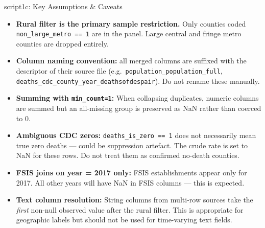 \documentclass[aspectratio=169]{beamer}
\begin{document}
\begin{frame}{script1c: Key Assumptions \& Caveats}
\begin{itemize}
    \item \textbf{Rural filter is the primary sample restriction.} Only counties coded \texttt{non\_large\_metro == 1} are in the panel. Large central and fringe metro counties are dropped entirely.
    \item \textbf{Column naming convention:} all merged columns are suffixed with the descriptor of their source file (e.g.\ \texttt{population\_population\_full}, \texttt{deaths\_cdc\_county\_year\_deathsofdespair}). Do not rename these manually.
    \item \textbf{Summing with \texttt{min\_count=1}:} When collapsing duplicates, numeric columns are summed but an all-missing group is preserved as NaN rather than coerced to 0.
    \item \textbf{Ambiguous CDC zeros:} \texttt{deaths\_is\_zero == 1} does not necessarily mean true zero deaths — could be suppression artefact. The crude rate is set to NaN for these rows. Do not treat them as confirmed no-death counties.
    \item \textbf{FSIS joins on year = 2017 only:} FSIS establishments appear only for 2017. All other years will have NaN in FSIS columns — this is expected.
    \item \textbf{Text column resolution:} String columns from multi-row sources take the \textit{first} non-null observed value after the rural filter. This is appropriate for geographic labels but should not be used for time-varying text fields.
\end{itemize}
\end{frame}

\end{document}
